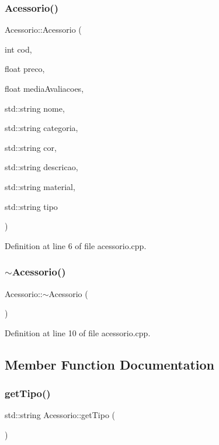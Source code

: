 \subsubsection{\texorpdfstring{Acessorio()}{Acessorio()}}
{\footnotesize\ttfamily Acessorio\+::\+Acessorio (\begin{DoxyParamCaption}\item[{int}]{cod,  }\item[{float}]{preco,  }\item[{float}]{media\+Avaliacoes,  }\item[{std\+::string}]{nome,  }\item[{std\+::string}]{categoria,  }\item[{std\+::string}]{cor,  }\item[{std\+::string}]{descricao,  }\item[{std\+::string}]{material,  }\item[{std\+::string}]{tipo }\end{DoxyParamCaption})}



Definition at line 6 of file acessorio.\+cpp.

\mbox{\label{class_acessorio_a195ee52794ef04607c8a0650eee0534c}} 
\subsubsection{\texorpdfstring{$\sim$\+Acessorio()}{~Acessorio()}}
{\footnotesize\ttfamily Acessorio\+::$\sim$\+Acessorio (\begin{DoxyParamCaption}{ }\end{DoxyParamCaption})}



Definition at line 10 of file acessorio.\+cpp.



\subsection{Member Function Documentation}
\mbox{\label{class_acessorio_af067ac3ad0d179f1ad86e7809cb86670}} 
\subsubsection{\texorpdfstring{get\+Tipo()}{getTipo()}}
{\footnotesize\ttfamily std\+::string Acessorio\+::get\+Tipo (\begin{DoxyParamCaption}{ }\end{DoxyParamCaption})}



